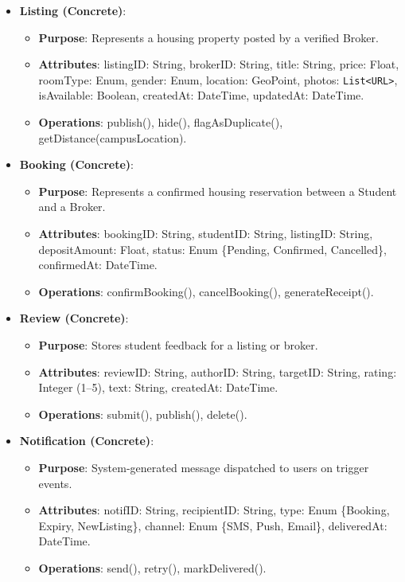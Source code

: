 \documentclass[12pt,a4paper]{article}
\begin{document}
\begin{itemize}[leftmargin=0.5cm]
    \item \textbf{Listing (Concrete)}: 
    \begin{itemize}
        \item \textbf{Purpose}: Represents a housing property posted by a verified Broker.
        \item \textbf{Attributes}: listingID: String, brokerID: String, title: String, price: Float, roomType: Enum, gender: Enum, location: GeoPoint, photos: \texttt{List<URL>}, isAvailable: Boolean, createdAt: DateTime, updatedAt: DateTime.
        \item \textbf{Operations}: publish(), hide(), flagAsDuplicate(), getDistance(campusLocation).
    \end{itemize}
    
    \item \textbf{Booking (Concrete)}: 
    \begin{itemize}
        \item \textbf{Purpose}: Represents a confirmed housing reservation between a Student and a Broker.
        \item \textbf{Attributes}: bookingID: String, studentID: String, listingID: String, depositAmount: Float, status: Enum \{Pending, Confirmed, Cancelled\}, confirmedAt: DateTime.
        \item \textbf{Operations}: confirmBooking(), cancelBooking(), generateReceipt().
    \end{itemize}
    
    \item \textbf{Review (Concrete)}: 
    \begin{itemize}
        \item \textbf{Purpose}: Stores student feedback for a listing or broker.
        \item \textbf{Attributes}: reviewID: String, authorID: String, targetID: String, rating: Integer (1--5), text: String, createdAt: DateTime.
        \item \textbf{Operations}: submit(), publish(), delete().
    \end{itemize}
    
    \item \textbf{Notification (Concrete)}: 
    \begin{itemize}
        \item \textbf{Purpose}: System-generated message dispatched to users on trigger events.
        \item \textbf{Attributes}: notifID: String, recipientID: String, type: Enum \{Booking, Expiry, NewListing\}, channel: Enum \{SMS, Push, Email\}, deliveredAt: DateTime.
        \item \textbf{Operations}: send(), retry(), markDelivered().
    \end{itemize}
\end{itemize}
\end{document}
